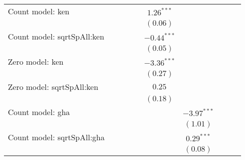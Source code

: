 \begin{center}
\begin{longtable}{l c c c c c c c c c}
Count model: ken               &               &               &               &               & $1.26^{***}$    &                 &               &                &               \\
                               &               &               &               &               & $(0.06)$        &                 &               &                &               \\
Count model: sqrtSpAll:ken     &               &               &               &               & $-0.44^{***}$   &                 &               &                &               \\
                               &               &               &               &               & $(0.05)$        &                 &               &                &               \\
Zero model: ken                &               &               &               &               & $-3.36^{***}$   &                 &               &                &               \\
                               &               &               &               &               & $(0.27)$        &                 &               &                &               \\
Zero model: sqrtSpAll:ken      &               &               &               &               & $0.25$          &                 &               &                &               \\
                               &               &               &               &               & $(0.18)$        &                 &               &                &               \\
Count model: gha               &               &               &               &               &                 & $-3.97^{***}$   &               &                &               \\
                               &               &               &               &               &                 & $(1.01)$        &               &                &               \\
Count model: sqrtSpAll:gha     &               &               &               &               &                 & $0.29^{***}$    &               &                &               \\
                               &               &               &               &               &                 & $(0.08)$        &               &                &               \\

\end{longtable}
\end{center}
